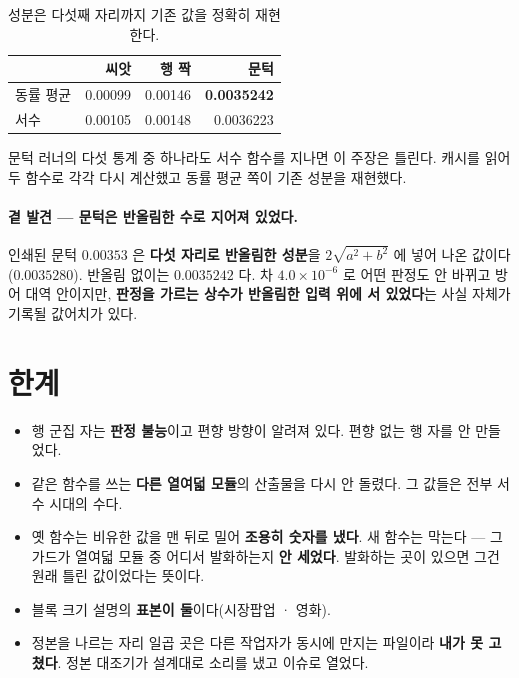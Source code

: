 \documentclass[10pt]{article}
\begin{document}
\begin{table}[t]\centering\small
\begin{tabular}{lrrr}
\hline
 & 씨앗 & 행 짝 & 문턱 \\
\hline
동률 평균 & 0.00099 & 0.00146 & \textbf{0.0035242} \\
서수 & 0.00105 & 0.00148 & 0.0036223 \\
\hline
\end{tabular}
\caption{성분은 다섯째 자리까지 기존 값을 정확히 재현한다.}
\label{tab:thr}
\end{table}

{문턱 러너의 다섯 통계 중 하나라도 서수 함수를 지나면 이 주장은 틀린다.
캐시를 읽어 두 함수로 각각 다시 계산했고 동률 평균 쪽이 기존 성분을 재현했다.}

\paragraph{곁 발견 --- 문턱은 반올림한 수로 지어져 있었다.} 인쇄된 문턱
$0.00353$ 은 \textbf{다섯 자리로 반올림한 성분}을 $2\sqrt{a^2+b^2}$ 에 넣어 나온
값이다($0.0035280$). 반올림 없이는 $0.0035242$ 다. 차 $4.0\times10^{-6}$ 로
어떤 판정도 안 바뀌고 방어 대역 안이지만, \textbf{판정을 가르는 상수가 반올림한
입력 위에 서 있었다}는 사실 자체가 기록될 값어치가 있다.

\section{한계}

\begin{itemize}\itemsep2pt
\item 행 군집 자는 \textbf{판정 불능}이고 편향 방향이 알려져 있다. 편향 없는
행 자를 안 만들었다.
\item 같은 함수를 쓰는 \textbf{다른 열여덟 모듈}의 산출물을 다시 안 돌렸다.
그 값들은 전부 서수 시대의 수다.
\item 옛 함수는 비유한 값을 맨 뒤로 밀어 \textbf{조용히 숫자를 냈다}. 새 함수는
막는다 --- 그 가드가 열여덟 모듈 중 어디서 발화하는지 \textbf{안 세었다}.
발화하는 곳이 있으면 그건 원래 틀린 값이었다는 뜻이다.
\item 블록 크기 설명의 \textbf{표본이 둘}이다(시장팝업 · 영화).
\item 정본을 나르는 자리 일곱 곳은 다른 작업자가 동시에 만지는 파일이라
\textbf{내가 못 고쳤다}. 정본 대조기가 설계대로 소리를 냈고 이슈로 열었다.
\end{itemize}
\end{document}
